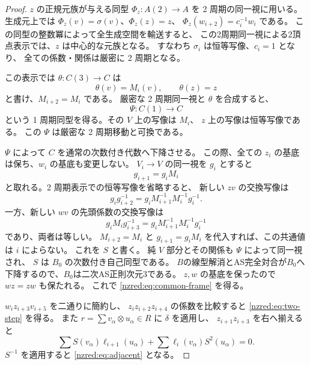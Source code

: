 \documentclass[11pt,a4paper]{ltjsarticle}
\theoremstyle{definition}
\begin{document}
\begin{proof}
$z$ の正規元族が与える同型 $\Phi_z:A(2)\to A$ を
2 周期の同一視に用いる。
生成元上では $\Phi_z(v)=\sigma(v)$、$\Phi_z(z)=z$、
$\Phi_z(w_{i+2})=c_i^{-1}w_i$ である。
この同型の整数冪によって全生成空間を輸送すると、
この2周期同一視による2頂点表示では、$z$ は中心的な元族となる。
すなわち $\sigma_i$ は恒等写像、$c_i=1$ となり、
全ての係数・関係は厳密に 2 周期となる。

この表示では $\theta:C(3)\to C$ は
\[
\theta(v)=M_i(v),\qquad\theta(z)=z
\]
と書け、$M_{i+2}=M_i$ である。
厳密な 2 周期同一視と $\theta$ を合成すると、
\[
\Psi:C(1)\longrightarrow C
\]
という 1 周期同型を得る。その $V$ 上の写像は $M_i$、
$z$ 上の写像は恒等写像である。
この $\Psi$ は厳密な 2 周期移動と可換である。

$\Psi$ によって $C$ を通常の次数付き代数へ下降させる。
この際、全ての $z_i$ の基底は保ち、$w_i$ の基底も変更しない。
$V_i\to V$ の同一視を $g_i$ とすると
\[
g_{i+1}=g_i M_i
\]
と取れる。2 周期表示での恒等写像を省略すると、
新しい $zv$ の交換写像は
\[
g_i g_{i+2}^{-1}
=g_i M_{i+1}^{-1}M_i^{-1}g_i^{-1}.
\]
一方、新しい $wv$ の先頭係数の交換写像は
\[
g_i M_i g_{i+3}^{-1}
=g_i M_{i+1}^{-1}M_i^{-1}g_i^{-1}
\]
であり、両者は等しい。
$M_{i+2}=M_i$ と $g_{i+1}=g_iM_i$ を代入すれば、この共通値は $i$ によらない。
これを $S$ と書く。
純 $V$ 部分とその関係も $\Psi$ によって同一視され、
$S$ は $B_0$ の次数付き自己同型である。
$B$の線型解消とAS完全対合が$B_0$へ下降するので、$B_0$は二次AS正則次元3である。
$z,w$ の基底を保ったので $wz=zw$ も保たれる。
これで \eqref{nzred:eq:common-frame} を得る。

$w_i z_{i+3}v_{i+5}$ を二通りに簡約し、
$z_i z_{i+2}z_{i+4}$ の係数を比較すると
\eqref{nzred:eq:two-step} を得る。
また $r=\sum v_\alpha\otimes u_\alpha\in R$ に $\delta$ を適用し、
$z_{i+1}z_{i+3}$ を右へ揃えると
\[
\sum S(v_\alpha)\ell_{i+1}(u_\alpha)
+\sum\ell_i(v_\alpha)S^2(u_\alpha)=0.
\]
$S^{-1}$ を適用すると \eqref{nzred:eq:adjacent} となる。
\end{proof}
\end{document}
